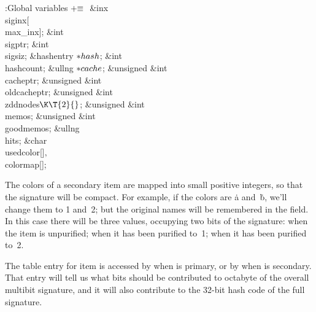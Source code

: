 \Y\B\4:Global variables\X${}\mathrel+\equiv{}$\6
\&{inx} \\{siginx}[\\{max\_inx}];\6
\&{int} \\{sigptr};\6
\&{int} \\{sigsiz};\6
\&{hashentry} ${}{*}\\{hash}{}$;\6
\&{int} \\{hashcount};\6
\&{ullng} ${}{*}\\{cache}{}$;\6
\&{unsigned} \&{int} \\{cacheptr};\6
\&{unsigned} \&{int} \\{oldcacheptr};\6
\&{unsigned} \&{int} \\{zddnodes}${}\K\T{2}{}$;\6
\&{unsigned} \&{int} \\{memos};\6
\&{unsigned} \&{int} \\{goodmemos};\6
\&{ullng} \\{hits};\6
\&{char} \\{usedcolor}[]${},{}$ \\{colormap}[];\par
\fi

The colors of a secondary item are mapped into small positive integers,
so that the signature will be compact. For example, if
the colors are \.a and~\.b, we'll change them to 1 and~2; but the
original names will be remembered in the  field.
In this case there will be three  values, occupying two bits
of the signature:  when the item is unpurified; 
when it has been purified to~1;  when it has been
purified to~2.

The  table entry for item  is accessed by
 when  is primary, or by
 when  is secondary.
That entry will tell us what bits should be contributed to
octabyte  of the overall multibit signature,
and it will also contribute to the 32-bit hash code of the full signature.

